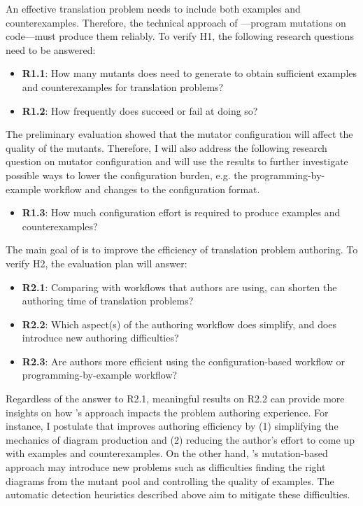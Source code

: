An effective translation problem needs to include both examples and counterexamples. Therefore, the technical approach of \Edgeworth---program mutations on \Substance code---must produce them reliably. To verify H1, the following research questions need to be answered:

\begin{itemize}
    \item \textbf{R1.1}: How many mutants does \Edgeworth need to generate to obtain sufficient examples and counterexamples for translation problems?
    \item \textbf{R1.2}: How frequently does \Edgeworth succeed or fail at doing so?
\end{itemize}

The preliminary evaluation showed that the mutator configuration will affect the quality of the mutants. Therefore, I will also address the following research question on mutator configuration and will use the results to further investigate possible ways to lower the configuration burden, e.g. the programming-by-example workflow and changes to the configuration format.

\begin{itemize}
    \item \textbf{R1.3}: How much configuration effort is required to produce examples and counterexamples? 
\end{itemize}


The main goal of \Edgeworth is to improve the efficiency of translation problem authoring. To verify H2, the evaluation plan will answer:
\begin{itemize}
    \item  \textbf{R2.1}: Comparing with workflows that authors are using, can \Edgeworth shorten the authoring time of translation problems?
    \item  \textbf{R2.2}: Which aspect(s) of the authoring workflow does \Edgeworth simplify, and does \Edgeworth introduce new authoring difficulties? 
    \item  \textbf{R2.3}: Are authors more efficient using the configuration-based workflow or programming-by-example workflow?
\end{itemize}

Regardless of the answer to R2.1, meaningful results on R2.2 can provide more insights on how \Edgeworth's approach impacts the problem authoring experience. For instance, I postulate that \Edgeworth improves authoring efficiency by (1) simplifying the mechanics of diagram production and (2) reducing the author's effort to come up with examples and counterexamples. On the other hand, \Edgeworth's mutation-based approach may introduce new problems such as difficulties finding the right diagrams from the mutant pool and controlling the quality of examples. The automatic detection heuristics described above aim to mitigate these difficulties.

